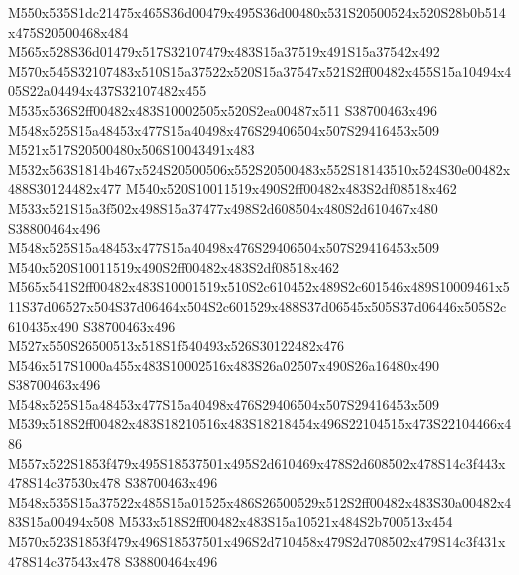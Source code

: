 \documentclass{article}
\begin{document}
\begin{multicols}{2}


M550x535S1dc21475x465S36d00479x495S36d00480x531S20500524x520S28b0b514x475S20500468x484 M565x528S36d01479x517S32107479x483S15a37519x491S15a37542x492 M570x545S32107483x510S15a37522x520S15a37547x521S2ff00482x455S15a10494x405S22a04494x437S32107482x455 M535x536S2ff00482x483S10002505x520S2ea00487x511 S38700463x496 M548x525S15a48453x477S15a40498x476S29406504x507S29416453x509 M521x517S20500480x506S10043491x483 M532x563S1814b467x524S20500506x552S20500483x552S18143510x524S30e00482x488S30124482x477 M540x520S10011519x490S2ff00482x483S2df08518x462 M533x521S15a3f502x498S15a37477x498S2d608504x480S2d610467x480 S38800464x496 M548x525S15a48453x477S15a40498x476S29406504x507S29416453x509 M540x520S10011519x490S2ff00482x483S2df08518x462 M565x541S2ff00482x483S10001519x510S2c610452x489S2c601546x489S10009461x511S37d06527x504S37d06464x504S2c601529x488S37d06545x505S37d06446x505S2c610435x490 S38700463x496 M527x550S26500513x518S1f540493x526S30122482x476 M546x517S1000a455x483S10002516x483S26a02507x490S26a16480x490 S38700463x496 M548x525S15a48453x477S15a40498x476S29406504x507S29416453x509 M539x518S2ff00482x483S18210516x483S18218454x496S22104515x473S22104466x486 M557x522S1853f479x495S18537501x495S2d610469x478S2d608502x478S14c3f443x478S14c37530x478 S38700463x496 M548x535S15a37522x485S15a01525x486S26500529x512S2ff00482x483S30a00482x483S15a00494x508 M533x518S2ff00482x483S15a10521x484S2b700513x454 M570x523S1853f479x496S18537501x496S2d710458x479S2d708502x479S14c3f431x478S14c37543x478 S38800464x496





\end{multicols}
\end{document}
